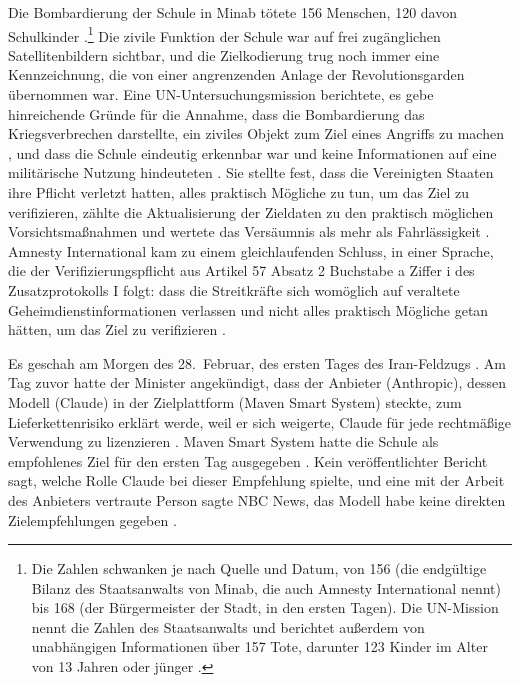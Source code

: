 Die Bombardierung der Schule in Minab tötete 156 Menschen, 120 davon Schulkinder \autocite[Ziff.~92]{UNFFMIran2026}.\footnote{Die Zahlen schwanken je nach Quelle und Datum, von 156 (die endgültige Bilanz des Staatsanwalts von Minab, die auch Amnesty International nennt) bis 168 (der Bürgermeister der Stadt, in den ersten Tagen). Die UN-Mission nennt die Zahlen des Staatsanwalts und berichtet außerdem von unabhängigen Informationen über 157 Tote, darunter 123 Kinder im Alter von 13 Jahren oder jünger \autocite[Ziff.~92–93]{UNFFMIran2026}.} Die zivile Funktion der Schule war auf frei zugänglichen Satellitenbildern sichtbar, und die Zielkodierung trug noch immer eine Kennzeichnung, die von einer angrenzenden Anlage der Revolutionsgarden übernommen war. Eine UN-Untersuchungsmission berichtete, es gebe hinreichende Gründe für die Annahme, dass die Bombardierung das Kriegsverbrechen darstellte, ein ziviles Objekt zum Ziel eines Angriffs zu machen \autocite{ohchr2026minabpress}, und dass die Schule eindeutig erkennbar war und keine Informationen auf eine militärische Nutzung hindeuteten \autocite[Ziff.~81–86, 124–126]{UNFFMIran2026}. Sie stellte fest, dass die Vereinigten Staaten ihre Pflicht verletzt hatten, alles praktisch Mögliche zu tun, um das Ziel zu verifizieren, zählte die Aktualisierung der Zieldaten zu den praktisch möglichen Vorsichtsmaßnahmen und wertete das Versäumnis als mehr als Fahrlässigkeit \autocite[Ziff.~124–125]{UNFFMIran2026}. Amnesty International kam zu einem gleichlaufenden Schluss, in einer Sprache, die der Verifizierungspflicht aus Artikel 57 Absatz 2 Buchstabe a Ziffer i des Zusatzprotokolls I folgt: dass die Streitkräfte sich womöglich auf veraltete Geheimdienstinformationen verlassen und nicht alles praktisch Mögliche getan hätten, um das Ziel zu verifizieren \autocite{Amnesty2026Minab}.

Es geschah am Morgen des 28.~Februar, des ersten Tages des Iran-Feldzugs \autocite{Amnesty2026Minab,crs2026iranwar}. Am Tag zuvor hatte der Minister angekündigt, dass der Anbieter (Anthropic), dessen Modell (Claude) in der Zielplattform (Maven Smart System) steckte, zum Lieferkettenrisiko erklärt werde, weil er sich weigerte, Claude für jede rechtmäßige Verwendung zu lizenzieren \autocite{npr2026openai}. Maven Smart System hatte die Schule als empfohlenes Ziel für den ersten Tag ausgegeben \autocite{livingstone2026maven,gizmodo2026minab}. Kein veröffentlichter Bericht sagt, welche Rolle Claude bei dieser Empfehlung spielte, und eine mit der Arbeit des Anbieters vertraute Person sagte NBC News, das Modell habe keine direkten Zielempfehlungen gegeben \autocite{nbc2026targeting}.


